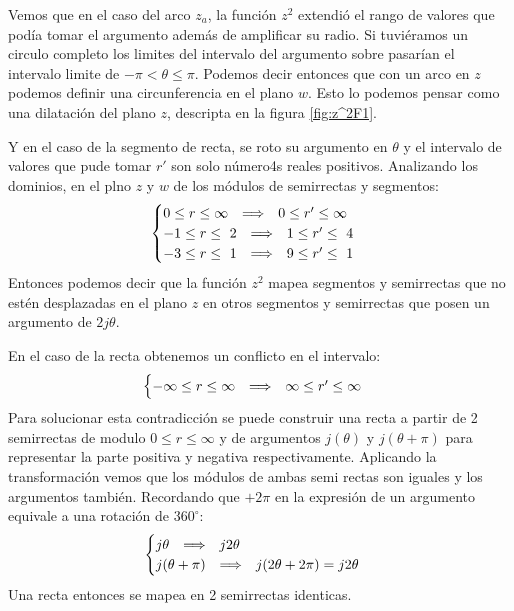 Vemos que en el caso del arco $z_a$, la función $z^2$ extendió el rango de valores que podía tomar el argumento además de amplificar su radio. Si tuviéramos un circulo completo los limites del intervalo del argumento sobre pasarían el intervalo limite de $-\pi<\theta\leq\pi$. Podemos decir entonces que con un arco en $z$ podemos definir una circunferencia en el plano $w$. Esto lo podemos pensar como una dilatación del plano $z$, descripta en la figura \ref{fig:z^2F1}.

Y en el caso de la segmento de recta, se roto su argumento en $\theta$ y el intervalo de valores que pude tomar $r'$ son solo número4s reales positivos. Analizando los dominios, en el plno 
$z$ y $w$ de los módulos de semirrectas y segmentos:
\begin{equation}
    \begin{cases}
        0\leq r\leq\infty\hspace{0.25cm} \Longrightarrow \hspace{0.25cm} 0\leq r'\leq\infty\\
        -1\leq r\leq\ 2\hspace{0.25cm} \Longrightarrow \hspace{0.25cm} 1\leq r'\leq\ 4\\
        -3\leq r\leq\ 1\hspace{0.25cm} \Longrightarrow \hspace{0.25cm} 9\leq r'\leq\ 1\\
    \end{cases}
\end{equation}
Entonces podemos decir que la función $z^2$ mapea segmentos y semirrectas que no estén desplazadas en el plano $z$ en otros segmentos y semirrectas que posen un argumento de $2j\theta$. 


En el caso de la recta obtenemos un conflicto en el intervalo:
\begin{equation}
    \begin{cases}
        -\infty\leq r\leq\infty\hspace{0.25cm} \Longrightarrow \hspace{0.25cm}\infty\leq r'\leq\infty\\
    \end{cases}
\end{equation}
Para solucionar esta contradicción se puede construir una recta a partir de 2 semirrectas de modulo $0\leq r\leq\infty$ y de argumentos $j(\theta)$ y $j(\theta+\pi)$ para representar la parte positiva y negativa respectivamente. Aplicando la transformación vemos que los módulos de ambas semi rectas son iguales y los argumentos también. Recordando que $+2\pi$ en la expresión de un argumento equivale a una rotación de $360^{\circ}$:
\begin{equation}
    \begin{cases}
        j\theta\hspace{0.25cm} \Longrightarrow \hspace{0.25cm} j2\theta\\
        j(\theta+\pi)\hspace{0.25cm} \Longrightarrow \hspace{0.25cm} j(2\theta+2\pi)=j2\theta
    \end{cases}
\end{equation}
Una recta entonces se mapea en 2 semirrectas identicas.

